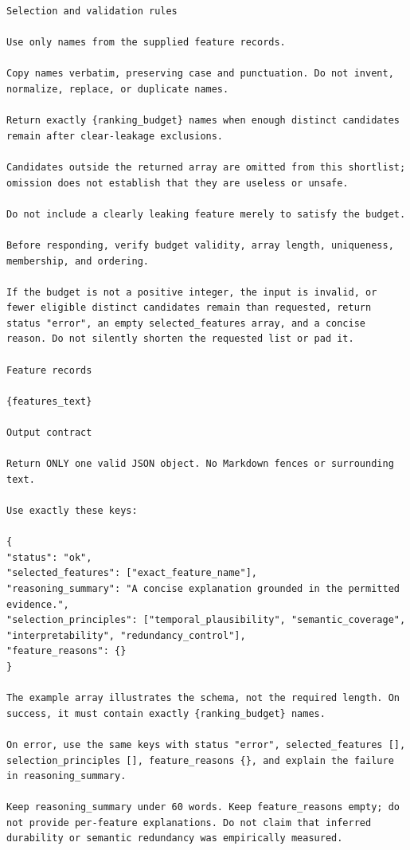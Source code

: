 \documentclass[final,5p,twocolumn]{elsarticle}
\begin{document}
\begin{lstlisting}
Selection and validation rules

Use only names from the supplied feature records.

Copy names verbatim, preserving case and punctuation. Do not invent, normalize, replace, or duplicate names.

Return exactly {ranking_budget} names when enough distinct candidates remain after clear-leakage exclusions.

Candidates outside the returned array are omitted from this shortlist; omission does not establish that they are useless or unsafe.

Do not include a clearly leaking feature merely to satisfy the budget.

Before responding, verify budget validity, array length, uniqueness, membership, and ordering.

If the budget is not a positive integer, the input is invalid, or fewer eligible distinct candidates remain than requested, return status "error", an empty selected_features array, and a concise reason. Do not silently shorten the requested list or pad it.

Feature records

{features_text}

Output contract

Return ONLY one valid JSON object. No Markdown fences or surrounding text.

Use exactly these keys:

{
"status": "ok",
"selected_features": ["exact_feature_name"],
"reasoning_summary": "A concise explanation grounded in the permitted evidence.",
"selection_principles": ["temporal_plausibility", "semantic_coverage", "interpretability", "redundancy_control"],
"feature_reasons": {}
}

The example array illustrates the schema, not the required length. On success, it must contain exactly {ranking_budget} names.

On error, use the same keys with status "error", selected_features [], selection_principles [], feature_reasons {}, and explain the failure in reasoning_summary.

Keep reasoning_summary under 60 words. Keep feature_reasons empty; do not provide per-feature explanations. Do not claim that inferred durability or semantic redundancy was empirically measured.
\end{lstlisting}
\end{document}
